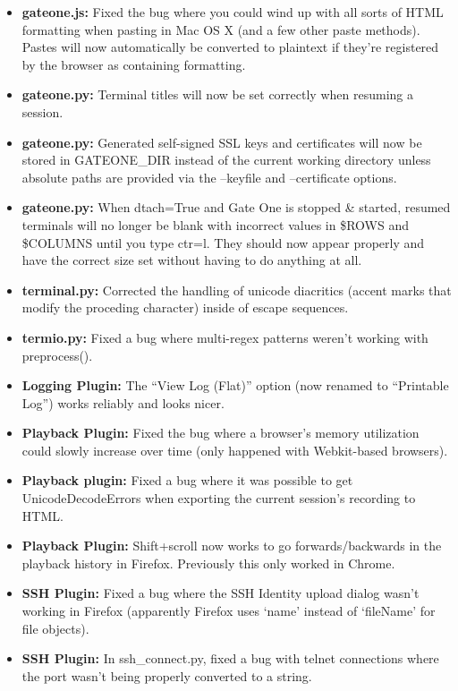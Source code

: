 \documentclass[letterpaper,10pt,openany]{sphinxmanual}
\begin{document}
\begin{itemize}
\item {} 
\textbf{gateone.js:}  Fixed the bug where you could wind up with all sorts of HTML formatting when pasting in Mac OS X (and a few other paste methods).  Pastes will now automatically be converted to plaintext if they're registered by the browser as containing formatting.

\item {} 
\textbf{gateone.py:}  Terminal titles will now be set correctly when resuming a session.

\item {} 
\textbf{gateone.py:}  Generated self-signed SSL keys and certificates will now be stored in GATEONE\_DIR instead of the current working directory unless absolute paths are provided via the --keyfile and --certificate options.

\item {} 
\textbf{gateone.py:}  When dtach=True and Gate One is stopped \& started, resumed terminals will no longer be blank with incorrect values in \$ROWS and \$COLUMNS until you type ctr=l.  They should now appear properly and have the correct size set without having to do anything at all.

\item {} 
\textbf{terminal.py:}  Corrected the handling of unicode diacritics (accent marks that modify the proceding character) inside of escape sequences.

\item {} 
\textbf{termio.py:}  Fixed a bug where multi-regex patterns weren't working with preprocess().

\item {} 
\textbf{Logging Plugin:}  The ``View Log (Flat)'' option (now renamed to ``Printable Log'') works reliably and looks nicer.

\item {} 
\textbf{Playback Plugin:}  Fixed the bug where a browser's memory utilization could slowly increase over time (only happened with Webkit-based browsers).

\item {} 
\textbf{Playback plugin:}  Fixed a bug where it was possible to get UnicodeDecodeErrors when exporting the current session's recording to HTML.

\item {} 
\textbf{Playback Plugin:}  Shift+scroll now works to go forwards/backwards in the playback history in Firefox.  Previously this only worked in Chrome.

\item {} 
\textbf{SSH Plugin:}  Fixed a bug where the SSH Identity upload dialog wasn't working in Firefox (apparently Firefox uses `name' instead of `fileName' for file objects).

\item {} 
\textbf{SSH Plugin:}  In ssh\_connect.py, fixed a bug with telnet connections where the port wasn't being properly converted to a string.

\end{itemize}
\end{document}
